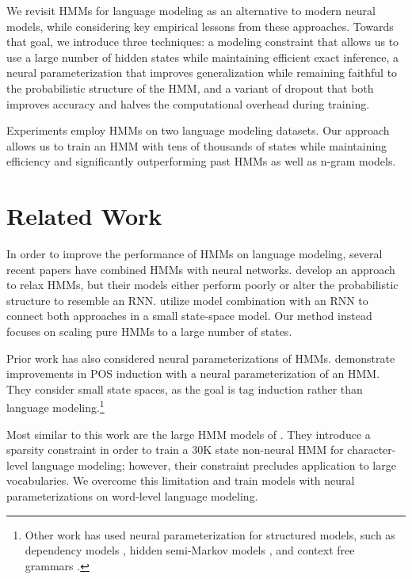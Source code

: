 \documentclass[11pt,a4paper]{article}
\begin{document}
We revisit HMMs for language modeling
as an alternative to modern neural models,
while considering key empirical lessons from these approaches. 
Towards that goal, we introduce three techniques:
a modeling constraint that allows us to use a large number of hidden states 
while maintaining efficient exact inference,
a neural parameterization that improves
generalization while remaining faithful to the
probabilistic structure of the HMM,
and a variant of dropout that both improves accuracy
and halves the computational overhead during training.

Experiments employ HMMs on two language modeling datasets.
Our approach allows us to train an HMM with tens of thousands of states
while maintaining efficiency and
significantly outperforming past HMMs as well as n-gram models.

\section{Related Work}
\label{sec:rw}
In order to improve the performance of HMMs on language modeling,
several recent papers have combined HMMs with neural networks.
\citet{buys2018hmm} develop an approach to relax HMMs,
but their models either perform poorly or alter the probabilistic structure to resemble an RNN. 
\citet{krakovna2016hmm} utilize model combination with an RNN to connect both approaches in a
small state-space model.
Our method instead focuses on scaling pure HMMs to a large number of states.

Prior work has also considered neural parameterizations of HMMs. 
\citet{tran2016hmm} demonstrate improvements in POS induction with a
neural parameterization of an HMM.
They consider small state spaces,
as the goal is tag induction rather than language modeling.\footnote{
Other work has used neural parameterization for structured models, such as 
dependency models \citep{han2017dependency},
hidden semi-Markov models \citep{wiseman2018hsmm},
and context free grammars \citep{kim2019cpcfg}.
}

Most similar to this work are the large HMM models of 
\citet{dedieu2019learning}. They introduce a sparsity constraint
in order to train a 30K state non-neural HMM for character-level language modeling;
however, their constraint precludes application to large vocabularies.
We overcome this limitation and train models with 
neural parameterizations on word-level language modeling.
\end{document}
